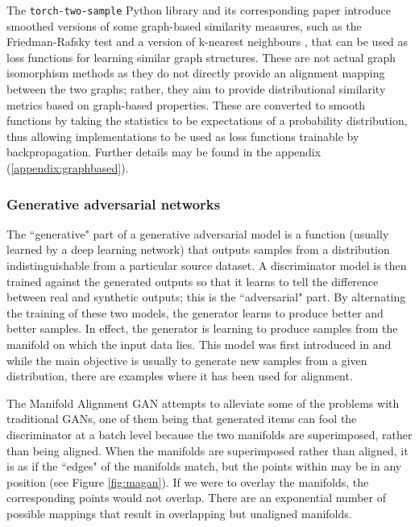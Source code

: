 The \texttt{torch-two-sample} Python library and its corresponding paper \cite{torchtwosample} introduce smoothed versions of some graph-based similarity measures, such as the Friedman-Rafsky test \cite{friedmanrafsky} and a version of k-nearest neighbours \cite{torchtwosample}, that can be used as loss functions for learning similar graph structures. These are not actual graph isomorphism methods as they do not directly provide an alignment mapping between the two graphs; rather, they aim to provide distributional similarity metrics based on graph-based properties. These are converted to smooth functions by taking the statistics to be expectations of a probability distribution, thus allowing implementations to be used as loss functions trainable by backpropagation. Further details may be found in the appendix (\ref{appendix:graphbased}). 

\subsubsection{Generative adversarial networks}

The ``generative" part of a generative adversarial model is a function (usually learned by a deep learning network) that outputs samples from a distribution indistinguishable from a particular source dataset. A discriminator model is then trained against the generated outputs so that it learns to tell the difference between real and synthetic outputs; this is the ``adversarial" part. By alternating the training of these two models, the generator learns to produce better and better samples. In effect, the generator is learning to produce samples from the manifold on which the input data lies. This model was first introduced in \cite{GAN} and while the main objective is usually to generate new samples from a given distribution, there are examples where it has been used for alignment.

The Manifold Alignment GAN \cite{magan} attempts to alleviate some of the problems with traditional GANs, one of them being that generated items can fool the discriminator at a batch level because the two manifolds are superimposed, rather than being aligned. When the manifolds are superimposed rather than aligned, it is as if the ``edges" of the manifolds match, but the points within may be in any position (see Figure \ref{fig:magan}). If we were to overlay the manifolds, the corresponding points would not overlap. There are an exponential number of possible mappings that result in overlapping but unaligned manifolds. 


